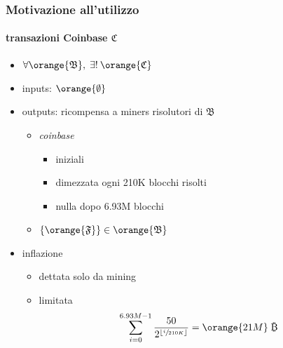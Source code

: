 \begin{frame}
	\frametitle{Motivazione all'utilizzo}
		\framesubtitle{transazioni Coinbase $\mathfrak{C}$}
		
		\begin{itemize}
			\item $\forall \orange{\mathfrak{B}},\; \exists!\:\orange{\mathfrak{C}}$
			\item inputs: $\orange{\emptyset}$
			\item outputs: ricompensa a {\color{blue}miners risolutori} di $\mathfrak{B}$ 
			\begin{itemize}
				\item \textit{coinbase}
				\begin{itemize}
				  	\item {} \bitcoinA\; iniziali
					\item dimezzata ogni 210K blocchi risolti
					\item nulla dopo 6.93M blocchi
				\end{itemize}
				\item $\{\orange{\mathfrak{F}}\} \in \orange{\mathfrak{B}}$
			\end{itemize}
			\item inflazione 
			\begin{itemize}
				\item dettata solo da mining
				\item limitata
					$$\sum_{i=0}^{6.93M-1}{\frac{50}{2^{\lfloor\sfrac{i}{210K}\rfloor}}}=\orange{21M}\;\bitcoinA $$ 	
			\end{itemize}
		\end{itemize}
		
\end{frame}
 
% 
% 
